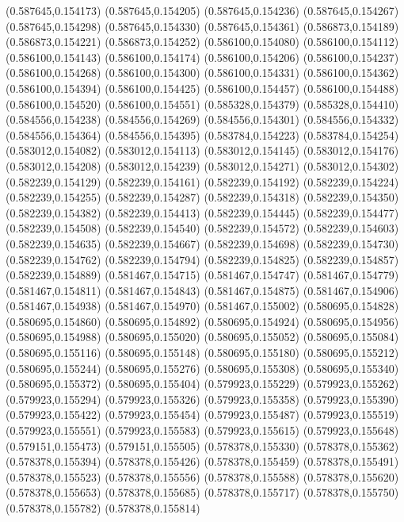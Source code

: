 (0.587645,0.154173)
(0.587645,0.154205)
(0.587645,0.154236)
(0.587645,0.154267)
(0.587645,0.154298)
(0.587645,0.154330)
(0.587645,0.154361)
(0.586873,0.154189)
(0.586873,0.154221)
(0.586873,0.154252)
(0.586100,0.154080)
(0.586100,0.154112)
(0.586100,0.154143)
(0.586100,0.154174)
(0.586100,0.154206)
(0.586100,0.154237)
(0.586100,0.154268)
(0.586100,0.154300)
(0.586100,0.154331)
(0.586100,0.154362)
(0.586100,0.154394)
(0.586100,0.154425)
(0.586100,0.154457)
(0.586100,0.154488)
(0.586100,0.154520)
(0.586100,0.154551)
(0.585328,0.154379)
(0.585328,0.154410)
(0.584556,0.154238)
(0.584556,0.154269)
(0.584556,0.154301)
(0.584556,0.154332)
(0.584556,0.154364)
(0.584556,0.154395)
(0.583784,0.154223)
(0.583784,0.154254)
(0.583012,0.154082)
(0.583012,0.154113)
(0.583012,0.154145)
(0.583012,0.154176)
(0.583012,0.154208)
(0.583012,0.154239)
(0.583012,0.154271)
(0.583012,0.154302)
(0.582239,0.154129)
(0.582239,0.154161)
(0.582239,0.154192)
(0.582239,0.154224)
(0.582239,0.154255)
(0.582239,0.154287)
(0.582239,0.154318)
(0.582239,0.154350)
(0.582239,0.154382)
(0.582239,0.154413)
(0.582239,0.154445)
(0.582239,0.154477)
(0.582239,0.154508)
(0.582239,0.154540)
(0.582239,0.154572)
(0.582239,0.154603)
(0.582239,0.154635)
(0.582239,0.154667)
(0.582239,0.154698)
(0.582239,0.154730)
(0.582239,0.154762)
(0.582239,0.154794)
(0.582239,0.154825)
(0.582239,0.154857)
(0.582239,0.154889)
(0.581467,0.154715)
(0.581467,0.154747)
(0.581467,0.154779)
(0.581467,0.154811)
(0.581467,0.154843)
(0.581467,0.154875)
(0.581467,0.154906)
(0.581467,0.154938)
(0.581467,0.154970)
(0.581467,0.155002)
(0.580695,0.154828)
(0.580695,0.154860)
(0.580695,0.154892)
(0.580695,0.154924)
(0.580695,0.154956)
(0.580695,0.154988)
(0.580695,0.155020)
(0.580695,0.155052)
(0.580695,0.155084)
(0.580695,0.155116)
(0.580695,0.155148)
(0.580695,0.155180)
(0.580695,0.155212)
(0.580695,0.155244)
(0.580695,0.155276)
(0.580695,0.155308)
(0.580695,0.155340)
(0.580695,0.155372)
(0.580695,0.155404)
(0.579923,0.155229)
(0.579923,0.155262)
(0.579923,0.155294)
(0.579923,0.155326)
(0.579923,0.155358)
(0.579923,0.155390)
(0.579923,0.155422)
(0.579923,0.155454)
(0.579923,0.155487)
(0.579923,0.155519)
(0.579923,0.155551)
(0.579923,0.155583)
(0.579923,0.155615)
(0.579923,0.155648)
(0.579151,0.155473)
(0.579151,0.155505)
(0.578378,0.155330)
(0.578378,0.155362)
(0.578378,0.155394)
(0.578378,0.155426)
(0.578378,0.155459)
(0.578378,0.155491)
(0.578378,0.155523)
(0.578378,0.155556)
(0.578378,0.155588)
(0.578378,0.155620)
(0.578378,0.155653)
(0.578378,0.155685)
(0.578378,0.155717)
(0.578378,0.155750)
(0.578378,0.155782)
(0.578378,0.155814)

